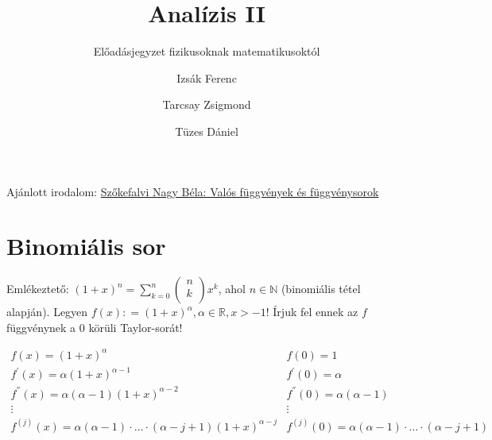 \documentclass[12pt,a4paper]{scrartcl}
\title{Analízis II}
\subtitle{Előadásjegyzet fizikusoknak matematikusoktól}
\author{Izsák Ferenc \and Tarcsay Zsigmond \and Tüzes Dániel}
\institute{ELTE}
\date{}
\begin{document}
\maketitle


\setcounter{tocdepth}{6}
\tableofcontents

Ajánlott irodalom:
\href{http://www.typotex.hu/konyv/valos_fuggvenyek_es_fuggvenysorok}{Szőkefalvi
Nagy Béla: Valós függvények és függvénysorok}

\hypertarget{binomialis-sor}{%
\section{\texorpdfstring{\textbf{Binomiális
sor}}{Binomiális sor}}\label{binomialis-sor}}

Emlékeztető:
\(\left( {1 + x} \right)^{n} = {\sum\limits_{k = 0}^{n}{\begin{pmatrix} n \\ k \\ \end{pmatrix}x^{k}}}\),
ahol \(n \in {\mathbb{N}}\) (binomiális tétel alapján). Legyen
\(f\left( x \right): = \left( {1 + x} \right)^{\alpha},\alpha \in {\mathbb{R}},x > - 1\)!
Írjuk fel ennek az \(f\) függvénynek a 0 körüli Taylor-sorát!

\[\begin{array}{ll}
{f\left( x \right) = \left( {1 + x} \right)^{\alpha}} & {f\left( 0 \right) = 1} \\
{f^{\prime}\left( x \right) = \alpha\left( {1 + x} \right)^{\alpha - 1}} & {f^{\prime}\left( 0 \right) = \alpha} \\
{f^{''}\left( x \right) = \alpha\left( {\alpha - 1} \right)\left( {1 + x} \right)^{\alpha - 2}} & {f^{''}\left( 0 \right) = \alpha\left( {\alpha - 1} \right)} \\
 \vdots & \vdots \\
{f^{(j)}\left( x \right) = \alpha\left( {\alpha - 1} \right) \cdot \ldots \cdot \left( {\alpha - j + 1} \right)\left( {1 + x} \right)^{\alpha - j}} & {f^{(j)}\left( 0 \right) = \alpha\left( {\alpha - 1} \right) \cdot \ldots \cdot \left( {\alpha - j + 1} \right)} \\
\end{array}\]
\end{document}
